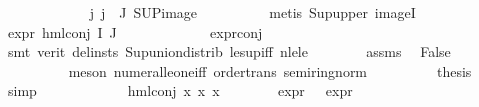 \begin{isabellebody}
\ \ \ \ \ \ \ \ \isamarkupfalse%
\ {\isacartoucheopen}{\isasympsi}\ {\isacharequal}{\kern0pt}\ {\isasymPhi}\ j{\isacartoucheclose}\ {\isacartoucheopen}j\ {\isasymin}\ J{\isacartoucheclose}\ SUP{\isacharunderscore}{\kern0pt}image\isanewline
\ \ \ \ \ \ \ \ \isamarkupfalse%
\ {\isacharparenleft}{\kern0pt}metis\ Sup{\isacharunderscore}{\kern0pt}upper{}\ imageI{\isacharparenright}{\kern0pt}\isanewline
\ \ \ \ \ \ \isamarkupfalse%
\ {\isachardoublequoteopen}expr{\isacharunderscore}{\kern0pt}{}\ {\isacharparenleft}{\kern0pt}hml{\isacharunderscore}{\kern0pt}conj\ I\ J\ {\isasymPhi}{\isacharparenright}{\kern0pt}\ {\isasymge}\ {}{\isachardoublequoteclose}\isanewline
\ \ \ \ \ \ \ \ \isamarkupfalse%
\ expr{\isacharunderscore}{\kern0pt}{}{\isacharunderscore}{\kern0pt}conj\isanewline
\ \ \ \ \ \ \ \ \isamarkupfalse%
\ {\isacharparenleft}{\kern0pt}smt\ {\isacharparenleft}{\kern0pt}verit{\isacharcomma}{\kern0pt}\ del{\isacharunderscore}{\kern0pt}insts{\isacharparenright}{\kern0pt}\ Sup{\isacharunderscore}{\kern0pt}union{\isacharunderscore}{\kern0pt}distrib\ le{\isacharunderscore}{\kern0pt}sup{\isacharunderscore}{\kern0pt}iff\ nle{\isacharunderscore}{\kern0pt}le{\isacharparenright}{\kern0pt}\isanewline
\ \ \ \ \ \ \isamarkupfalse%
\ assms{\isacharparenleft}{\kern0pt}{}{\isacharparenright}{\kern0pt}\ \isamarkupfalse%
\ False\ \ \ \ \ \ \ \isanewline
\ \ \ \ \ \ \ \ \isamarkupfalse%
\ {\isacharparenleft}{\kern0pt}meson\ numeral{\isacharunderscore}{\kern0pt}le{\isacharunderscore}{\kern0pt}one{\isacharunderscore}{\kern0pt}iff\ order{\isacharunderscore}{\kern0pt}trans\ semiring{\isacharunderscore}{\kern0pt}norm{\isacharparenleft}{\kern0pt}{}{}{\isacharparenright}{\kern0pt}{\isacharparenright}{\kern0pt}\isanewline
\ \ \ \ \ \ \isamarkupfalse%
\ \isamarkupfalse%
\ {\isacharquery}{\kern0pt}thesis\ \isamarkupfalse%
\ simp\isanewline
\ \ \ \ \isamarkupfalse%
\isanewline
\ \ \ \ \ \ \isamarkupfalse%
\ {\isacharparenleft}{\kern0pt}hml{\isacharunderscore}{\kern0pt}conj\ x{}{}\ x{}{}\ x{}{}{\isacharparenright}{\kern0pt}\isanewline
\ \ \ \ \ \ \isamarkupfalse%
\ {\isachardoublequoteopen}expr{\isacharunderscore}{\kern0pt}{}\ {\isasymchi}\ {\isacharequal}{\kern0pt}\ expr{\isacharunderscore}{\kern0pt}{}\ {\isasympsi}{\isachardoublequoteclose}\isanewline

\end{isabellebody}
